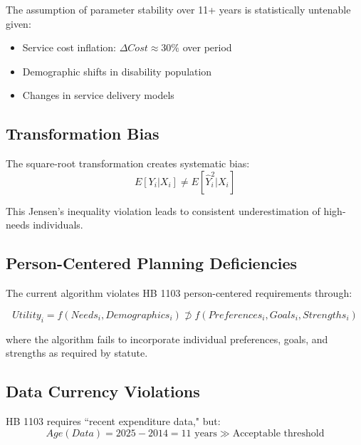 The assumption of parameter stability over 11+ years is statistically untenable given:
\begin{itemize}
    \item Service cost inflation: $\Delta Cost \approx 30\%$ over period
    \item Demographic shifts in disability population
    \item Changes in service delivery models
\end{itemize}

\subsection{Transformation Bias}
The square-root transformation creates systematic bias:
\begin{equation}
E[Y_i | X_i] \neq E[\hat{Y}_i^2 | X_i]
\end{equation}

This Jensen's inequality violation leads to consistent underestimation of high-needs individuals.


\subsection{Person-Centered Planning Deficiencies}

The current algorithm violates HB 1103 person-centered requirements through:

\begin{equation}
Utility_i = f(Needs_i, Demographics_i) \not\supset f(Preferences_i, Goals_i, Strengths_i)
\end{equation}

where the algorithm fails to incorporate individual preferences, goals, and strengths as required by statute.

\subsection{Data Currency Violations}

HB 1103 requires ``recent expenditure data," but:
\begin{equation}
Age(Data) = 2025 - 2014 = 11 \text{ years} \gg \text{Acceptable threshold}
\end{equation}

